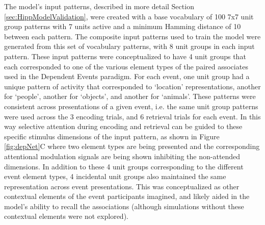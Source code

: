 \documentclass[11pt, titlepage, twoside]{article}
\begin{document}
The model's input patterns, described in more detail Section \ref{sec:HippModelValidation}, were created with a base vocabulary of 100 7x7 unit group patterns with 7 units active and a minimum Hamming distance of 10 between each pattern.  The composite input patterns used to train the model were generated from this set of vocabulary patterns, with 8 unit groups in each input pattern.  These input patterns were conceptualized to have 4 unit groups that each corresponded to one of the various element types of the paired associates used in the Dependent Events paradigm.  For each event, one unit group had a unique pattern of activity that corresponded to `location' representations, another for `people', another for `objects', and another for `animals'.  These patterns were consistent across presentations of a given event, i.e. the same unit group patterns were used across the 3 encoding trials, and 6 retrieval trials for each event. In this way selective attention during encoding and retrieval can be  guided to these specific stimulus dimensions of the input pattern, as shown in Figure \ref{fig:depNet}C where two element types are being presented and the corresponding attentional modulation signals are being shown inhibiting the non-attended dimensions.  In addition to these 4 unit groups corresponding to the different event element types, 4 incidental unit groups also maintained the same representation across event presentations.  This was conceptualized as other contextual elements of the event participants imagined, and likely aided in the model's ability to recall the associations (although simulations without these contextual elements were not explored). 
\end{document}
